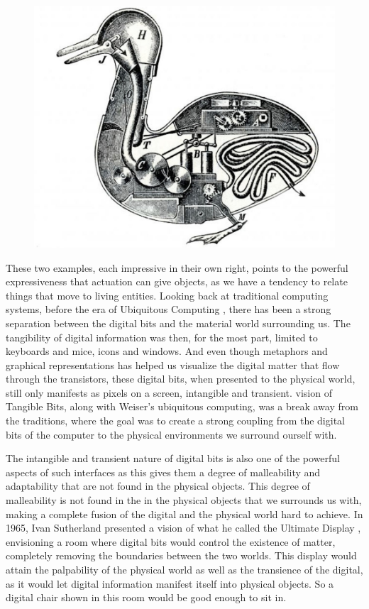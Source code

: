 \begin{figure}[h]
	\centering
	\begin{minipage}[b]{.8\textwidth}
		\centering
		\includegraphics[width=.7\linewidth]{figures/vaucanson_duck}
		\label{vaucanson_duck}
	\end{minipage}
\end{figure}

These two examples, each impressive in their own right, points to the powerful expressiveness that actuation can give objects, as we have a tendency to relate things that move to living entities. 
\blank  
Looking back at traditional computing systems, before the era of Ubiquitous Computing \citep{weiser1991computer}, there has been a strong separation between the digital bits and the material world surrounding us.
The tangibility of digital information was then, for the most part, limited to keyboards and mice, icons and windows. 
And even though metaphors and graphical representations has helped us visualize the digital matter that flow through the transistors, these digital bits, when presented to the physical world, still only manifests as pixels on a screen, intangible and transient. 
\citet{ishii1997tangible} vision of Tangible Bits, along with Weiser's ubiquitous computing, was a break away from the traditions, where the goal was to create a strong coupling from the digital bits of the computer to the physical environments we surround ourself with.

The intangible and transient nature of digital bits is also one of the powerful aspects of such interfaces as this gives them a degree of malleability and adaptability that are not found in the physical objects.
This degree of malleability is not found in the in the physical objects that we surrounds us with, making a complete fusion of the digital and the physical world hard to achieve.
\blank
In 1965, Ivan Sutherland presented a vision of what he called the Ultimate Display \citep{sutherland1965ultimate}, envisioning a room where digital bits would control the existence of matter, completely removing the boundaries between the two worlds.
This display would attain the palpability of the physical world as well as the transience of the digital, as it would let digital information manifest itself into physical objects.
So a digital chair shown in this room would be good enough to sit in.

